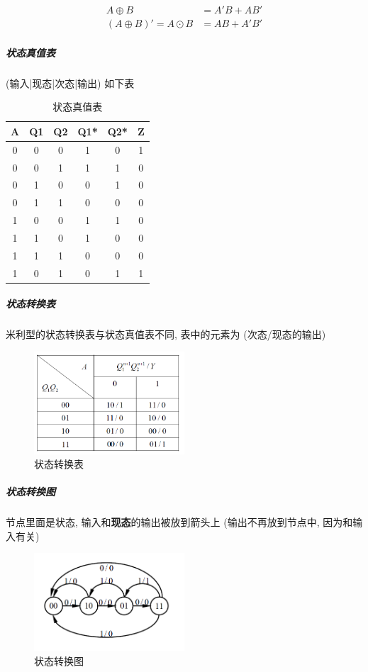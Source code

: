 \documentclass[scheme=chinese,a4paper]{report}
\begin{document}
\begin{align*}
    A\oplus B&=A'B+AB'\\
    (A\oplus B)'=A\odot B&= AB+A'B' 
\end{align*}
\subparagraph{状态真值表} (输入|现态|次态|输出) 如下表
\begin{table}[H]
    \centering
    \caption{状态真值表} 
      \begin{tabular}{c|cc|cc|c}
      A     & Q1    & Q2    & Q1*   & Q2*   & Z \\
      \hline
      0     & 0     & 0     & 1     & 0     & 1 \\
      0     & 0     & 1     & 1     & 1     & 0 \\
      0     & 1     & 0     & 0     & 1     & 0 \\
      0     & 1     & 1     & 0     & 0     & 0 \\
      1     & 0     & 0     & 1     & 1     & 0 \\
      1     & 1     & 0     & 1     & 0     & 0 \\
      1     & 1     & 1     & 0     & 0     & 0 \\
      1     & 0     & 1     & 0     & 1     & 1 \\
      \end{tabular}%
  \end{table}%
\subparagraph{状态转换表} 米利型的状态转换表与状态真值表不同, 表中的元素为 (次态/现态的输出)
\begin{figure}[H]
\centering
\includegraphics[width=0.5\textwidth]{sync_example_table.png}
\caption{状态转换表}
\end{figure}

\subparagraph{状态转换图} 节点里面是状态, 输入和\textbf{现态}的输出被放到箭头上 (输出不再放到节点中, 因为和输入有关)
\begin{figure}[H]
\centering
\includegraphics[width=0.5\textwidth]{sync_example_graph_2.png}
\caption{状态转换图}
\end{figure}
\end{document}
